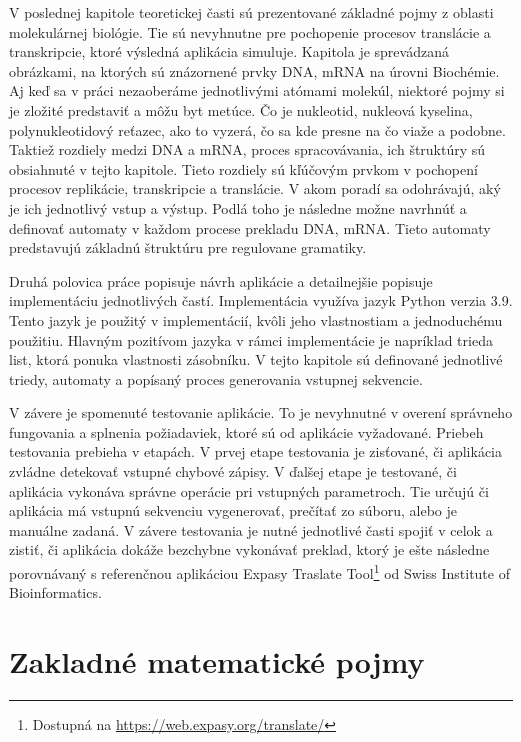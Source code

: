 V poslednej kapitole teoretickej časti sú prezentované základné pojmy z oblasti molekulárnej biológie. Tie sú nevyhnutne pre pochopenie procesov translácie a transkripcie, ktoré výsledná aplikácia simuluje. Kapitola je sprevádzaná obrázkami, na ktorých sú znázornené prvky DNA, mRNA na úrovni Biochémie. Aj keď sa v práci nezaoberáme jednotlivými atómami molekúl, niektoré pojmy si je zložité predstaviť a môžu byt metúce. Čo je nukleotid, nukleová kyselina, polynukleotidový reťazec, ako to vyzerá, čo sa kde presne na čo viaže a podobne. Taktiež rozdiely medzi DNA a mRNA, proces spracovávania, ich štruktúry sú obsiahnuté v tejto kapitole. Tieto rozdiely sú kľúčovým prvkom v pochopení procesov replikácie, transkripcie a translácie. V akom poradí sa odohrávajú, aký je ich jednotlivý vstup a výstup. Podlá toho je následne možne navrhnúť a definovať automaty v každom procese prekladu DNA, mRNA. Tieto automaty predstavujú základnú štruktúru pre regulovane gramatiky. 

Druhá polovica práce popisuje návrh aplikácie a detailnejšie popisuje implementáciu jednotlivých častí. Implementácia využíva jazyk Python verzia 3.9. Tento jazyk je použitý v implementácií, kvôli jeho vlastnostiam a jednoduchému použitiu. Hlavným pozitívom jazyka v rámci implementácie je napríklad trieda list, ktorá ponuka vlastnosti zásobníku. V tejto kapitole sú definované jednotlivé triedy, automaty a popísaný proces generovania vstupnej sekvencie.





 V závere je spomenuté testovanie aplikácie. To je nevyhnutné v overení správneho fungovania a splnenia požiadaviek, ktoré sú od aplikácie vyžadované. Priebeh testovania prebieha v etapách. V prvej etape testovania je zisťované, či aplikácia zvládne detekovať vstupné chybové zápisy. V ďalšej etape je testované, či aplikácia vykonáva správne operácie pri vstupných parametroch. Tie určujú či aplikácia má vstupnú sekvenciu vygenerovať, prečítať zo súboru, alebo je manuálne zadaná. V závere testovania je nutné jednotlivé časti spojiť v celok a zistiť, či aplikácia dokáže bezchybne vykonávať preklad, ktorý je ešte následne porovnávaný s referenčnou aplikáciou Expasy Traslate Tool\footnote{Dostupná na \href{https://web.expasy.org/translate/}{https://web.expasy.org/translate/}} od Swiss Institute of Bioinformatics.


\chapter{Zakladné matematické pojmy} 
\label{matematika}

